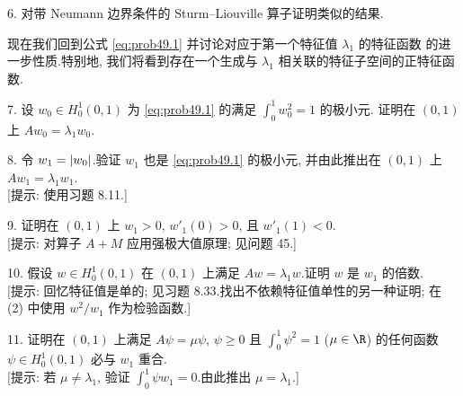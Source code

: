 \begin{problem}
6. 对带 Neumann 边界条件的 Sturm--Liouville 算子证明类似的结果.

现在我们回到公式 \eqref{eq:prob49.1} 并讨论对应于第一个特征值 $\lambda_1$ 的特征函数
的进一步性质.特别地, 我们将看到存在一个生成与 $\lambda_1$ 相关联的特征子空间的正特征函数.

7. 设 $w_0\in H_0^1(0,1)$ 为 \eqref{eq:prob49.1} 的满足 $\int_0^1w_0^2=1$ 的极小元.
证明在 $(0,1)$ 上 $Aw_0=\lambda_1w_0$.

8. 令 $w_1=\left|w_0\right|$.验证 $w_1$ 也是 \eqref{eq:prob49.1} 的极小元, 并由此推出在
$(0,1)$ 上 $Aw_1=\lambda_1w_1$.\\
{[提示: 使用习题 8.11.]}

9. 证明在 $(0,1)$ 上 $w_1>0$, $w'_1(0)>0$, 且 $w'_1(1)<0$.\\
{[提示: 对算子 $A+M$ 应用强极大值原理; 见问题 45.]}

10. 假设 $w\in H_0^1(0,1)$ 在 $(0,1)$ 上满足 $Aw=\lambda_1w$.证明 $w$ 是 $w_1$ 的倍数.\\
{[提示: 回忆特征值是单的; 见习题 8.33.找出不依赖特征值单性的另一种证明; 在 (2) 中使用
$w^2/w_1$ 作为检验函数.]}

11. 证明在 $(0,1)$ 上满足 $A\psi=\mu\psi$, $\psi\ge0$ 且 $\int_0^1\psi^2=1$ ($\mu\in\R$)
的任何函数 $\psi\in H_0^1(0,1)$ 必与 $w_1$ 重合.\\
{[提示: 若 $\mu\ne\lambda_1$, 验证 $\int_0^1\psi w_1=0$.由此推出 $\mu=\lambda_1$.]}
\end{problem}

